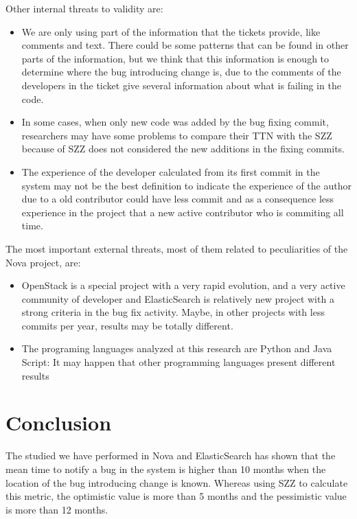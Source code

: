\documentclass[10pt, conference]{IEEEtran}
\begin{document}
Other internal threats to validity are:
\begin{itemize}
    \item We are only using part of the information that the tickets provide, like comments and text. There could be some patterns that can be found in other parts of the information, but we think that this information is enough to determine where the bug introducing change is, due to the comments of the developers in the ticket give several information about what is failing in the code.
    \item In some cases, when only new code was added by the bug fixing commit, researchers may have some problems to compare their TTN with the SZZ because of SZZ does not considered the new additions in the fixing commits. 
    \item The experience of the developer calculated from its first commit in the system may not be the best definition to indicate the experience of the author due to a old contributor could have less commit and as a consequence less experience in the project that a new active contributor who is commiting all time.
\end{itemize}

The most important external threats, most of them related to peculiarities of the Nova project, are:
\begin{itemize}
    \item OpenStack is a special project with a very rapid evolution, and a very active community of developer and ElasticSearch is relatively new project with a strong criteria in the bug fix activity. Maybe, in other projects with less commits per year, results may be totally different.
    \item The programing languages analyzed at this research are Python and Java Script: It may happen that other programming languages present different results
\end{itemize}

\section{Conclusion}
\label{sec:conclusions}

The studied we have performed in Nova and ElasticSearch has shown that the mean time to notify a bug in the system is higher than 10 months when the location of the bug introducing change is known. Whereas using SZZ to calculate this metric, the optimistic value is more than 5 months and the pessimistic value is more than 12 months. 
\end{document}
